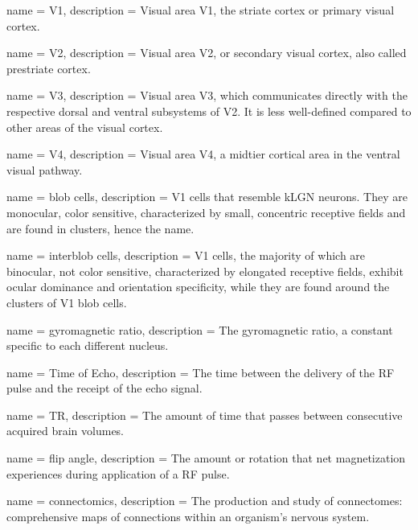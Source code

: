 {
	name = {V1},
	description = {Visual area V1, the striate cortex or primary visual cortex.}
}

{
	name = {V2},
	description = {Visual area V2, or secondary visual cortex, also called prestriate cortex.}
}

{
	name = {V3},
	description = {Visual area V3, which communicates directly with the respective dorsal and ventral subsystems of V2. It is less well-defined compared to other areas of the visual cortex.}
}

{
	name = {V4},
	description = {Visual area V4, a midtier cortical area in the ventral visual pathway.}
}

{
	name = {blob cells},
	description = {V1 cells that resemble kLGN neurons. They are monocular, color sensitive, characterized by small, concentric receptive fields and are found in clusters, hence the name.}
}

{
	name = {interblob cells},
	description = {V1 cells, the majority of which are binocular, not color sensitive, characterized by elongated receptive fields, exhibit ocular dominance and orientation specificity, while they are found around the clusters of V1 blob cells.}
}

{
	name = {gyromagnetic ratio},
	description = {The gyromagnetic ratio, a constant specific to each different nucleus.}
}

{
	name = {Time of Echo},
	description = {The time between the delivery of the RF pulse and the receipt of the echo signal.}
}

{
	name = {TR},
	description = {The amount of time that passes between consecutive acquired brain volumes.}
}

{
	name = {flip angle},
	description = {The amount or rotation that net magnetization experiences during application of a RF pulse.}
}

{
	name = {connectomics},
	description = {The production and study of connectomes: comprehensive maps of connections within an organism's nervous system.}
}